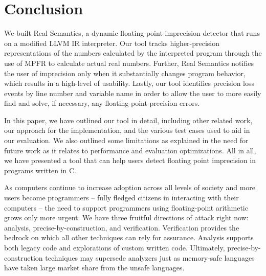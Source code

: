\section{Conclusion}
We built Real Semantics, a dynamic floating-point imprecision detector that runs on a modified LLVM IR interpreter. Our tool tracks higher-precision representations of the numbers calculated by the interpreted program through the use of MPFR to calculate actual real numbers. Further, Real Semantics notifies the user of imprecision only when it substantially changes program behavior, which results in a high-level of usability. Lastly, our tool identifies precision loss events by line number and variable name in order to allow the user to more easily find and solve, if necessary, any floating-point precision errors.

In this paper, we have outlined our tool in detail, including other related work, our approach for the implementation, and the various test cases used to aid in our evaluation. We also outlined some limitations as explained in the need for future work as it relates to performance and evaluation optimizations. All in all, we have presented a tool that can help users detect floating point imprecision in programs written in C.

As computers continue to increase adoption across all levels of society and more users become programmers -- fully fledged citizens in interacting with their computers -- the need to support programmers using floating-point arithmetic grows only more urgent. We have three fruitful directions of attack right now: analysis, precise-by-construction, and verification. Verification provides the bedrock on which all other techniques can rely for assurance. Analysis supports both legacy code and explorations of custom written code. Ultimately, precise-by-construction techniques may supersede analyzers just as memory-safe languages have taken large market share from the unsafe languages.
